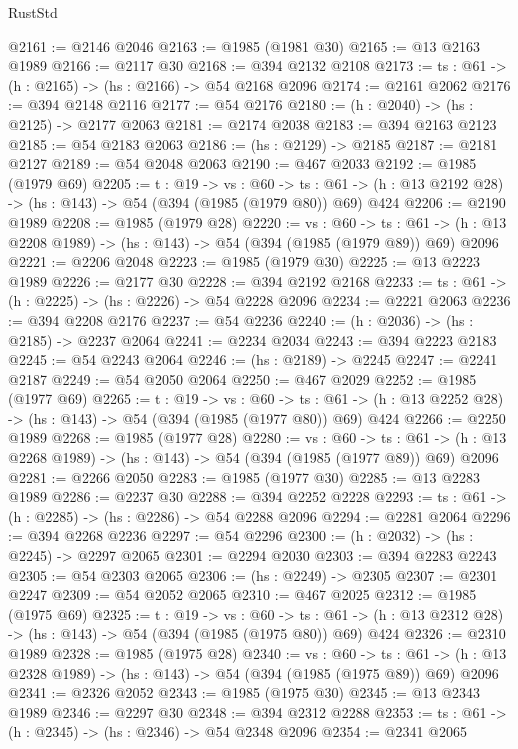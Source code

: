 \begin{lexlean}{RustStd}
\begin{coremodule}
{\begin{coremodule}
{{{{{{{{@2161 := @2146 @2046
@2163 := @1985 (@1981 @30)
@2165 := @13 @2163 @1989
@2166 := @2117 @30
@2168 := @394 @2132 @2108
@2173 := {ts : @61} -> (h : @2165) -> (hs : @2166) -> @54 @2168 @2096
@2174 := @2161 @2062
@2176 := @394 @2148 @2116
@2177 := @54 @2176
@2180 := (h : @2040) -> (hs : @2125) -> @2177 @2063
@2181 := @2174 @2038
@2183 := @394 @2163 @2123
@2185 := @54 @2183 @2063
@2186 := (hs : @2129) -> @2185
@2187 := @2181 @2127
@2189 := @54 @2048 @2063
@2190 := @467 @2033
@2192 := @1985 (@1979 @69)
@2205 := {t : @19} ->
  {vs : @60} ->
  {ts : @61} -> (h : @13 @2192 @28) -> (hs : @143) -> @54 (@394 (@1985 (@1979 @80)) @69) @424
@2206 := @2190 @1989
@2208 := @1985 (@1979 @28)
@2220 := {vs : @60} ->
  {ts : @61} -> (h : @13 @2208 @1989) -> (hs : @143) -> @54 (@394 (@1985 (@1979 @89)) @69) @2096
@2221 := @2206 @2048
@2223 := @1985 (@1979 @30)
@2225 := @13 @2223 @1989
@2226 := @2177 @30
@2228 := @394 @2192 @2168
@2233 := {ts : @61} -> (h : @2225) -> (hs : @2226) -> @54 @2228 @2096
@2234 := @2221 @2063
@2236 := @394 @2208 @2176
@2237 := @54 @2236
@2240 := (h : @2036) -> (hs : @2185) -> @2237 @2064
@2241 := @2234 @2034
@2243 := @394 @2223 @2183
@2245 := @54 @2243 @2064
@2246 := (hs : @2189) -> @2245
@2247 := @2241 @2187
@2249 := @54 @2050 @2064
@2250 := @467 @2029
@2252 := @1985 (@1977 @69)
@2265 := {t : @19} ->
  {vs : @60} ->
  {ts : @61} -> (h : @13 @2252 @28) -> (hs : @143) -> @54 (@394 (@1985 (@1977 @80)) @69) @424
@2266 := @2250 @1989
@2268 := @1985 (@1977 @28)
@2280 := {vs : @60} ->
  {ts : @61} -> (h : @13 @2268 @1989) -> (hs : @143) -> @54 (@394 (@1985 (@1977 @89)) @69) @2096
@2281 := @2266 @2050
@2283 := @1985 (@1977 @30)
@2285 := @13 @2283 @1989
@2286 := @2237 @30
@2288 := @394 @2252 @2228
@2293 := {ts : @61} -> (h : @2285) -> (hs : @2286) -> @54 @2288 @2096
@2294 := @2281 @2064
@2296 := @394 @2268 @2236
@2297 := @54 @2296
@2300 := (h : @2032) -> (hs : @2245) -> @2297 @2065
@2301 := @2294 @2030
@2303 := @394 @2283 @2243
@2305 := @54 @2303 @2065
@2306 := (hs : @2249) -> @2305
@2307 := @2301 @2247
@2309 := @54 @2052 @2065
@2310 := @467 @2025
@2312 := @1985 (@1975 @69)
@2325 := {t : @19} ->
  {vs : @60} ->
  {ts : @61} -> (h : @13 @2312 @28) -> (hs : @143) -> @54 (@394 (@1985 (@1975 @80)) @69) @424
@2326 := @2310 @1989
@2328 := @1985 (@1975 @28)
@2340 := {vs : @60} ->
  {ts : @61} -> (h : @13 @2328 @1989) -> (hs : @143) -> @54 (@394 (@1985 (@1975 @89)) @69) @2096
@2341 := @2326 @2052
@2343 := @1985 (@1975 @30)
@2345 := @13 @2343 @1989
@2346 := @2297 @30
@2348 := @394 @2312 @2288
@2353 := {ts : @61} -> (h : @2345) -> (hs : @2346) -> @54 @2348 @2096
@2354 := @2341 @2065
}}}}}}}}
\end{coremodule}}
\end{coremodule}
\end{lexlean}
